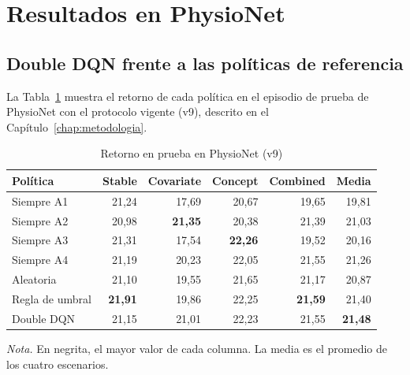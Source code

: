 \section{Resultados en PhysioNet}
\label{sec:res_physionet}

\subsection{Double DQN frente a las políticas de referencia}

La Tabla~\ref{tab:res_physionet_v9} muestra el retorno de cada política en el episodio de
prueba de PhysioNet con el protocolo vigente (v9), descrito en el Capítulo~\ref{chap:metodologia}.

\begin{table}[H]
    \centering
    \caption{Retorno en prueba en PhysioNet (v9)}
    \label{tab:res_physionet_v9}
    \begin{tabular}{lrrrrr}
        \toprule
        \textbf{Política} & \textbf{Stable} & \textbf{Covariate} & \textbf{Concept} & \textbf{Combined} & \textbf{Media} \\
        \midrule
        Siempre A1      & 21,24          & 17,69          & 20,67          & 19,65          & 19,81 \\
        Siempre A2      & 20,98          & \textbf{21,35} & 20,38          & 21,39          & 21,03 \\
        Siempre A3      & 21,31          & 17,54          & \textbf{22,26} & 19,52          & 20,16 \\
        Siempre A4      & 21,19          & 20,23          & 22,05          & 21,55          & 21,26 \\
        Aleatoria       & 21,10          & 19,55          & 21,65          & 21,17          & 20,87 \\
        Regla de umbral & \textbf{21,91} & 19,86          & 22,25          & \textbf{21,59} & 21,40 \\
        Double DQN      & 21,15          & 21,01          & 22,23          & 21,55          & \textbf{21,48} \\
        \bottomrule
    \end{tabular}

    \vspace{1mm}
    \begin{minipage}{0.85\textwidth}
        \footnotesize
        \textit{Nota.} En negrita, el mayor valor de cada columna. La media es el promedio de los
        cuatro escenarios.
    \end{minipage}
\end{table}

